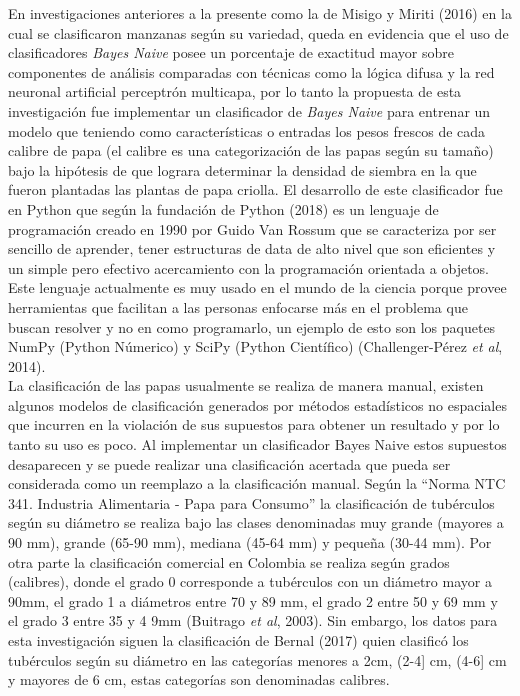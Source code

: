 En investigaciones anteriores a la presente como la de Misigo y Miriti (2016) en la cual se clasificaron
manzanas según su variedad, queda en evidencia que el uso de clasificadores
\textit{Bayes Naive} posee un porcentaje de exactitud mayor sobre componentes de análisis
comparadas con técnicas como la lógica difusa y la red neuronal artificial perceptrón
multicapa, por lo tanto la propuesta de esta investigación fue implementar un clasificador
de \textit{Bayes Naive} para entrenar un modelo que teniendo como características o
entradas los pesos frescos de cada calibre de papa (el calibre es una categorización
de las papas según su tamaño) bajo la hipótesis de que  lograra determinar  la densidad de siembra en la que fueron plantadas las plantas
de papa criolla. El desarrollo de este clasificador fue en Python que según la fundación
de Python (2018) es un lenguaje de programación creado en 1990 por Guido Van Rossum que
se caracteriza por ser sencillo de aprender, tener estructuras de data de alto nivel que
son eficientes y un simple pero efectivo acercamiento con la programación orientada a
objetos. Este lenguaje actualmente es muy usado en el mundo de la ciencia porque provee
herramientas que facilitan a las personas enfocarse más en el problema que buscan
resolver y no en como programarlo, un ejemplo de esto son los paquetes NumPy (Python
Númerico) y SciPy (Python Científico) (Challenger-Pérez \textit{et al}, 2014).\\

La clasificación de las papas usualmente se realiza de manera manual, existen algunos
modelos de clasificación generados por métodos estadísticos no espaciales que incurren
en la violación de sus supuestos para obtener un resultado y por lo tanto su uso es poco.
Al implementar un clasificador Bayes Naive estos supuestos desaparecen y se puede
realizar una clasificación acertada que pueda ser considerada como un reemplazo a la
clasificación manual. Según la "`Norma NTC 341. Industria Alimentaria - Papa para
Consumo"' la clasificación de tubérculos según su diámetro se realiza bajo las clases
denominadas muy grande (mayores a 90 mm), grande (65-90 mm), mediana (45-64 mm) y pequeña
(30-44 mm). Por otra parte la clasificación comercial en Colombia se realiza según grados
(calibres), donde el grado 0 corresponde a tubérculos con un diámetro mayor a 90mm, el
grado 1 a diámetros entre 70 y 89 mm, el grado 2 entre 50 y 69 mm y el grado 3 entre 35 y
4 9mm (Buitrago \textit{et al}, 2003). Sin embargo, los datos para esta investigación siguen la
clasificación de Bernal (2017) quien clasificó los tubérculos según su diámetro en las
categorías menores a 2cm, (2-4] cm, (4-6] cm y mayores de 6 cm, estas categorías son
denominadas calibres.\\

